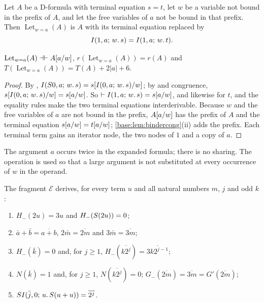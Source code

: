 \begin{definition}
\label{base:def:let}
Let $A$ be a D-formula with terminal equation $s=t$, let $w$ be a variable
not bound in the prefix of $A$, and let the free variables of $a$ not be
bound in that prefix.  Then $\operatorname{Let}_{w=a}(A)$ is $A$ with its
terminal equation replaced by
\[
 I(1,a;\,w.\,s)=I(1,a;\,w.\,t).
\]
\end{definition}

\begin{lemma}
\label{base:lem:let}
$\operatorname{Let}_{w=a}(A)\dashv\vdash A[a/w]$,
$r(\operatorname{Let}_{w=a}(A))=r(A)$ and
$T(\operatorname{Let}_{w=a}(A))=T(A)+2|a|+6$.
\end{lemma}

\begin{proof}
By , $I(S 0,a;\,w.\,s)=s[I(0,a;\,w.\,s)/w]$; by
 and congruence, $s[I(0,a;\,w.\,s)/w]=s[a/w]$.
So $\vdash I(1,a;\,w.\,s)=s[a/w]$, and likewise for $t$, and the
equality rules make the two terminal equations interderivable.  Because $w$
and the free variables of $a$ are not bound in the prefix, $A[a/w]$
has the prefix of $A$ and the terminal equation
$s[a/w]=t[a/w]$; \cref{base:lem:bindercong}(ii) adds the
prefix.  Each terminal term gains an iterator node, the two nodes of $1$ and
a copy of $a$.
\end{proof}

The argument $a$ occurs twice in the expanded formula; there is no sharing.
The operation is used so that a large argument is not substituted at every
occurrence of $w$ in the operand.

\begin{lemma}
\label{base:lem:transitions}
The fragment $\mathcal E$ derives, for every term $u$ and all natural
numbers $m$, $j$ and odd $k$:
\begin{enumerate}[label=\textup{(\roman*)}]
\item $H_-(2u)=3u$ and $H_-(S(2u))=0$;
\item $\bar a+\bar b=\overline{a+b}$, $2\bar m=\overline{2m}$ and
 $3\bar m=\overline{3m}$;
\item $H_-(\bar k)=0$ and, for $j\ge 1$,
 $H_-(\overline{k2^{j}})=\overline{3k2^{j-1}}$;
\item $N(\bar k)=1$ and, for $j\ge 1$, $N(\overline{k2^{j}})=0$;
 $G_-(\overline{2m})=\overline{3m}=G'(\overline{2m})$;
\item $SI(\bar j,0;\,u.\,S(u+u))=\overline{2^{j}}$.
\end{enumerate}
\end{lemma}

